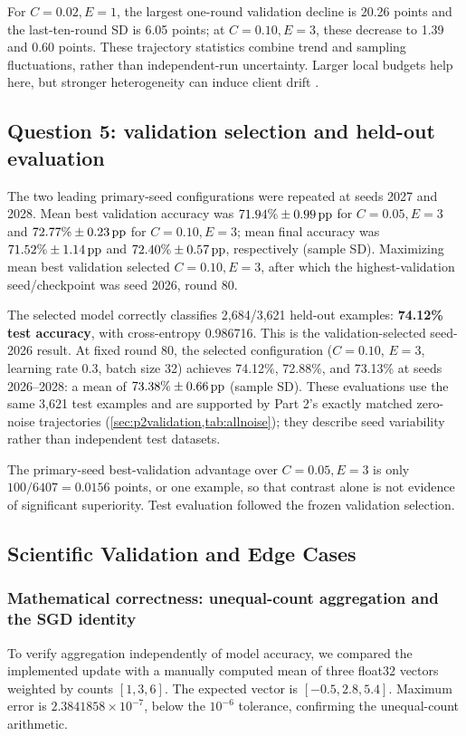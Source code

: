 For $C=0.02,E=1$, the largest one-round validation decline is 20.26 points and the last-ten-round SD is 6.05 points; at $C=0.10,E=3$, these decrease to 1.39 and 0.60 points. These trajectory statistics combine trend and sampling fluctuations, rather than independent-run uncertainty. Larger local budgets help here, but stronger heterogeneity can induce client drift \citep{courseFL}.

\subsection{Question 5: validation selection and held-out evaluation}
The two leading primary-seed configurations were repeated at seeds 2027 and 2028. Mean best validation accuracy was $71.94\%\pm0.99\,\text{pp}$ for $C=0.05,E=3$ and $72.77\%\pm0.23\,\text{pp}$ for $C=0.10,E=3$; mean final accuracy was $71.52\%\pm1.14\,\text{pp}$ and $72.40\%\pm0.57\,\text{pp}$, respectively (sample SD). Maximizing mean best validation selected $C=0.10,E=3$, after which the highest-validation seed/checkpoint was seed 2026, round 80.

The selected model correctly classifies 2,684/3,621 held-out examples: \textbf{74.12\% test accuracy}, with cross-entropy 0.986716. This is the validation-selected seed-2026 result. At fixed round 80, the selected configuration ($C=0.10$, $E=3$, learning rate 0.3, batch size 32) achieves 74.12\%, 72.88\%, and 73.13\% at seeds 2026--2028: a mean of $73.38\%\pm0.66\,\text{pp}$ (sample SD). These evaluations use the same 3,621 test examples and are supported by Part 2's exactly matched zero-noise trajectories (\cref{sec:p2validation,tab:allnoise}); they describe seed variability rather than independent test datasets.

The primary-seed best-validation advantage over $C=0.05,E=3$ is only $100/6407=0.0156$ points, or one example, so that contrast alone is not evidence of significant superiority. Test evaluation followed the frozen validation selection.

\subsection{Scientific Validation and Edge Cases}\label{sec:p11validation}
\subsubsection{Mathematical correctness: unequal-count aggregation and the SGD identity}
To verify aggregation independently of model accuracy, we compared the implemented update with a manually computed mean of three float32 vectors weighted by counts $[1,3,6]$. The expected vector is $[-0.5,2.8,5.4]$. Maximum error is $2.3841858\times10^{-7}$, below the $10^{-6}$ tolerance, confirming the unequal-count arithmetic.


